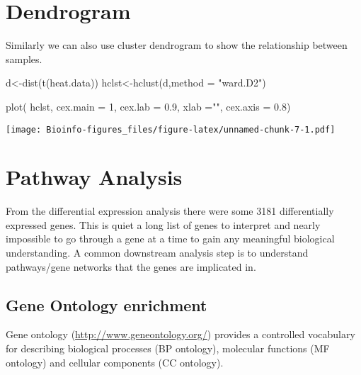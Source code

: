 \documentclass[
  openany]{book}
\newenvironment{Shaded}{\begin{snugshade}}{\end{snugshade}}
\newcommand{\AttributeTok}[1]{\textcolor[rgb]{0.77,0.63,0.00}{#1}}
\newcommand{\DecValTok}[1]{\textcolor[rgb]{0.00,0.00,0.81}{#1}}
\newcommand{\FloatTok}[1]{\textcolor[rgb]{0.00,0.00,0.81}{#1}}
\newcommand{\FunctionTok}[1]{\textcolor[rgb]{0.00,0.00,0.00}{#1}}
\newcommand{\NormalTok}[1]{#1}
\newcommand{\OtherTok}[1]{\textcolor[rgb]{0.56,0.35,0.01}{#1}}
\newcommand{\StringTok}[1]{\textcolor[rgb]{0.31,0.60,0.02}{#1}}
\begin{document}
\hypertarget{dendrogram}{%
\section{Dendrogram}\label{dendrogram}}

Similarly we can also use cluster dendrogram to show the relationship between samples.

\begin{Shaded}
\begin{Highlighting}[]
\NormalTok{d}\OtherTok{\textless{}{-}}\FunctionTok{dist}\NormalTok{(}\FunctionTok{t}\NormalTok{(heat.data))}
\NormalTok{hclst}\OtherTok{\textless{}{-}}\FunctionTok{hclust}\NormalTok{(d,}\AttributeTok{method =} \StringTok{"ward.D2"}\NormalTok{)}
\end{Highlighting}
\end{Shaded}

\begin{Shaded}
\begin{Highlighting}[]
\FunctionTok{plot}\NormalTok{(}
\NormalTok{    hclst,}
    \AttributeTok{cex.main =} \DecValTok{1}\NormalTok{,}
    \AttributeTok{cex.lab =} \FloatTok{0.9}\NormalTok{,}
    \AttributeTok{xlab =}\StringTok{""}\NormalTok{,}
    \AttributeTok{cex.axis =} \FloatTok{0.8}\NormalTok{)}
\end{Highlighting}
\end{Shaded}

\texttt{[image: Bioinfo-figures\_files/figure-latex/unnamed-chunk-7-1.pdf]}

\hypertarget{pathway-analysis}{%
\section{Pathway Analysis}\label{pathway-analysis}}

From the differential expression analysis there were some 3181 differentially expressed genes. This is quiet a long list of genes to interpret and nearly impossible to go through a gene at a time to gain any meaningful biological understanding. A common downstream analysis step is to understand pathways/gene networks that the genes are implicated in.

\hypertarget{gene-ontology-enrichment}{%
\subsection{Gene Ontology enrichment}\label{gene-ontology-enrichment}}

Gene ontology (\url{http://www.geneontology.org/}) provides a controlled vocabulary for describing biological processes (BP ontology), molecular functions (MF ontology) and cellular components (CC ontology).
\end{document}
